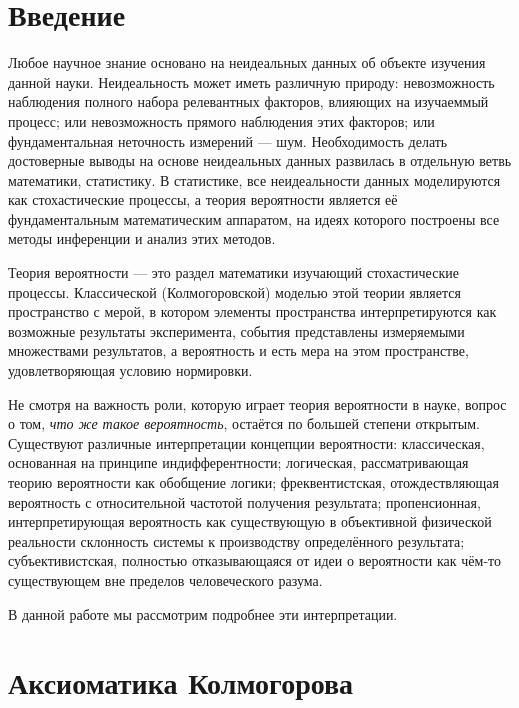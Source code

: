 \documentclass[14pt, a4paper, pdftex]{extarticle}
\begin{document}
	


\tableofcontents
\pagebreak

\section*{Введение}

Любое научное знание основано на неидеальных данных об объекте изучения данной науки. Неидеальность может иметь различную природу: невозможность наблюдения полного набора релевантных факторов, влияющих на изучаеммый процесс; или невозможность прямого наблюдения этих факторов; или фундаментальная неточность измерений --- шум. Необходимость делать достоверные выводы на основе неидеальных данных развилась в отдельную ветвь математики, статистику. В статистике, все неидеальности данных моделируются как стохастические процессы, а теория вероятности является её фундаментальным математическим аппаратом, на идеях которого построены все методы инференции и анализ этих методов.~\cite{Shalizi}

Теория вероятности --- это раздел математики изучающий стохастические процессы. Классической (Колмогоровской) моделью этой теории является пространство с мерой, в котором элементы пространства интерпретируются как возможные результаты эксперимента, события представлены измеряемыми множествами результатов, а вероятность и есть мера на этом пространстве, удовлетворяющая условию нормировки. 

Не смотря на важность роли, которую играет теория вероятности в науке, вопрос о том, \emph{что же такое вероятность}, остаётся по большей степени открытым. Существуют различные интерпретации концепции вероятности: классическая, основанная на принципе индифферентности; логическая, рассматривающая теорию вероятности как обобщение логики; фреквентистская, отождествляющая вероятность с относительной частотой получения результата; пропенсионная, интерпретирующая вероятность как существующую в объективной физической реальности склонность системы к производству определённого результата; субъективистская, полностью отказывающаяся от идеи о вероятности как чём-то существующем вне пределов человеческого разума.~\cite{Hajek}

В данной работе мы рассмотрим подробнее эти интерпретации.

\section{Аксиоматика Колмогорова}
\end{document}
